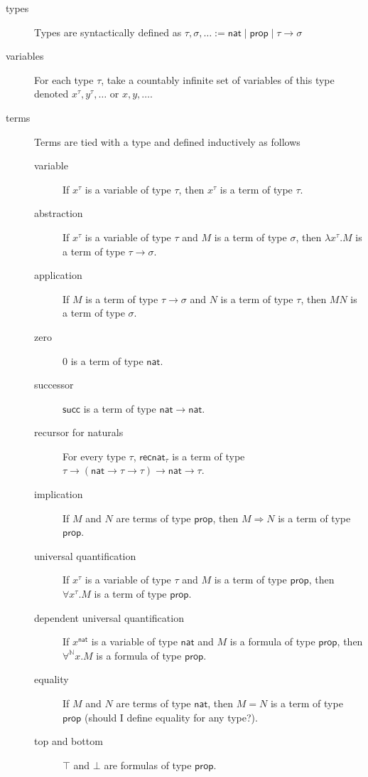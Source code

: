 \documentclass{article}
\newcommand{\successor}{\mathsf{succ}}
\newcommand{\N}{\mathbb{N}}
\newcommand{\nat}{\mathsf{nat}}
\newcommand{\depforall}[1]{\forall^\N #1.}
\newcommand{\prop}{\mathsf{prop}}
\newcommand{\recnat}[1]{\mathsf{recnat}_{#1}}
\begin{document}
\begin{description}
    \item[types] Types are syntactically defined as $\tau, \sigma, \dots := \nat \mid \prop \mid \tau \rightarrow \sigma$
    \item[variables] For each type $\tau$, take a countably infinite set of variables of this type denoted $x^\tau, y^\tau, \dots$ or $x, y, \dots$.
    \item[terms] Terms are tied with a type and defined inductively as follows
    \begin{description}
        \item[variable] If $x^\tau$ is a variable of type $\tau$, then $x^\tau$ is a term of type $\tau$.
        \item[abstraction] If $x^\tau$ is a variable of type $\tau$ and $M$ is a term of type $\sigma$, then $\lambda x^\tau. M$ is a term of type $\tau \rightarrow \sigma$.
        \item[application] If $M$ is a term of type $\tau \rightarrow \sigma$ and $N$ is a term of type $\tau$, then $MN$ is a term of type $\sigma$.
        \item[zero] $0$ is a term of type $\nat$.
        \item[successor] $\successor$ is a term of type $\nat \rightarrow \nat$.
        \item[recursor for naturals] For every type $\tau$, $\recnat\tau$ is a term of type $\tau \rightarrow (\nat \rightarrow \tau \rightarrow \tau) \rightarrow \nat \rightarrow \tau$.
        \item[implication] If $M$ and $N$ are terms of type $\prop$, then $M \Rightarrow N$ is a term of type $\prop$.
        \item[universal quantification] If $x^\tau$ is a variable of type $\tau$ and $M$ is a term of type $\prop$, then $\forall x^\tau. M$ is a term of type $\prop$.
        \item[dependent universal quantification] If $x^\nat$ is a variable of type $\nat$ and $M$ is a formula of type $\prop$, then $\depforall{x} M$ is a formula of type $\prop$.
        \item[equality] If $M$ and $N$ are terms of type $\nat$, then $M = N$ is a term of type $\prop$ (should I define equality for any type?).
        \item[top and bottom] $\top$ and $\bot$ are formulas of type $\prop$.
    \end{description}
\end{description}
\end{document}

